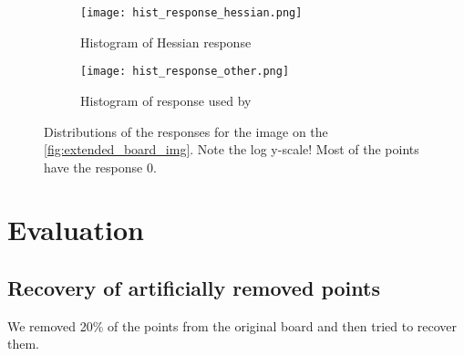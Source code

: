 \begin{figure}
	\centering
	\begin{subfigure}[t]{0.45\linewidth}
		\texttt{[image: hist\_response\_hessian.png]}
		\caption{Histogram of Hessian response}
	\end{subfigure}
	\begin{subfigure}[t]{0.45\linewidth}
		\texttt{[image: hist\_response\_other.png]}
		\caption{Histogram of response used by \cite{geigerAutomaticCameraRange2012}}
	\end{subfigure}
	\caption{Distributions of the responses for the image on the
		\cref{fig:extended_board_img}. Note the log y-scale! Most of the points have
		the response 0.}
\end{figure}

\section{Evaluation}\label{sec:evaluation}

\subsection{Recovery of artificially removed points}\label{sub:recovery_of_artificially_removed_points}

We removed 20\% of the points from the original board and then tried to recover
them.

